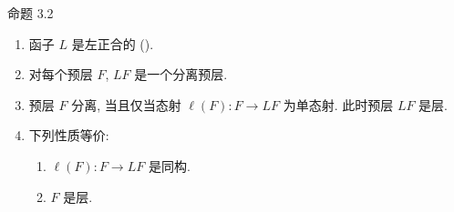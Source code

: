 \begin{enonce*}{命题 3.2}
\begin{enumerate}
\renewcommand{\labelenumi}{\theenumi)}
\item 函子 $L$ 是左正合的
{\rm().}

\item 对每个预层 $F$, $LF$ 是一个分离预层.

\item 预层 $F$ 分离, 当且仅当态射
$\ell(F):F\rightarrow LF$ 为单态射.
此时预层 $LF$ 是层.

\item 下列性质等价:
\begin{enumerate}
\renewcommand{\theenumii}{\roman{enumii}}
\renewcommand{\labelenumii}{(\theenumii)}
\item $\ell(F):F\rightarrow LF$ 是同构.

\item $F$ 是层.
\end{enumerate}
\end{enumerate}
\end{enonce*}

